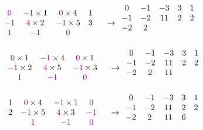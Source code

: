 \documentclass[11pt]{article}
\begin{document}
\[
\begin{array}{cccccccccc}
    &\textcolor{violet}{0}&\textcolor{violet}{-1}\times 1& \textcolor{violet}{0}\times 4&1&\\
    &\textcolor{violet}{-1}&\textcolor{violet}{4}\times 2&\textcolor{violet}{-1}\times 5&3&\\
    &\textcolor{violet}{1}&\textcolor{violet}{-1}&\textcolor{violet}{0}& \\ 
\end{array}
\rightarrow
\begin{array}{ccccc}
    0 & -1 & -3 & 3&1\\
    -1 & -2 & 11 & 2&2\\
    -2 & 2 &  & &  \\
     &  &  & &  \\
\end{array}
\]
\[
\begin{array}{cccccccccc}
    &&\textcolor{violet}{0}\times 1&\textcolor{violet}{-1}\times 4& \textcolor{violet}{0}\times 1&\\
    &&\textcolor{violet}{-1}\times 2&\textcolor{violet}{4}\times 5&\textcolor{violet}{-1}\times 3&\\
    &&\textcolor{violet}{1}&\textcolor{violet}{-1}&\textcolor{violet}{0}& \\ 
\end{array}
\rightarrow
\begin{array}{ccccc}
    0 & -1 & -3 & 3&1\\
    -1 & -2 & 11 & 2&2\\
    -2 & 2 & 11 & &  \\
     &  &  & &  \\
\end{array}
\]
\[
\begin{array}{cccccccccc}
    &&1&\textcolor{violet}{0}\times 4&\textcolor{violet}{-1}\times 1& \textcolor{violet}{0}\\
    &&2&\textcolor{violet}{-1}\times 5&\textcolor{violet}{4}\times 3&\textcolor{violet}{-1}\\
    &&&\textcolor{violet}{1}&\textcolor{violet}{-1}&\textcolor{violet}{0}& \\ 
\end{array}
\rightarrow
\begin{array}{ccccc}
    0 & -1 & -3 & 3&1\\
    -1 & -2 & 11 & 2&2\\
    -2 & 2 & 11 & 6&  \\
     &  &  & &  \\
\end{array}
\]
\end{document}
